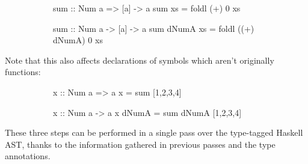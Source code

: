 \documentclass[dissertation.tex]{subfiles}
\begin{document}
{{{\begin{enumerate}
{                \begin{figure}[H]
                \centering
                \begin{subfigure}[t]{0.30\textwidth}
                \begin{haskellfigure}
                sum :: Num a => [a] -> a
                sum xs = foldl (+) 0 xs
                \end{haskellfigure}
                \end{subfigure}
                \hspace{5mm}
                \begin{subfigure}[t]{0.45\textwidth}
                \begin{haskellfigure}
                sum :: Num a -> [a] -> a
                sum dNumA xs = foldl ((+) dNumA) 0 xs
                \end{haskellfigure}
                \end{subfigure}
                \end{figure}

                Note that this also affects declarations of symbols which aren't originally functions:

                \begin{figure}[H]
                \centering
                \begin{subfigure}[t]{0.30\textwidth}
                \begin{haskellfigure}
                x :: Num a => a
                x = sum [1,2,3,4]
                \end{haskellfigure}
                \end{subfigure}
                \hspace{5mm}
                \begin{subfigure}[t]{0.45\textwidth}
                \begin{haskellfigure}
                x :: Num a -> a
                x dNumA = sum dNumA [1,2,3,4]
                \end{haskellfigure}
                \end{subfigure}
                \end{figure}

            }
            \end{enumerate}

            These three steps can be performed in a single pass over the type-tagged Haskell AST, thanks to the information gathered in previous passes and the type annotations.

}}}
\end{document}
